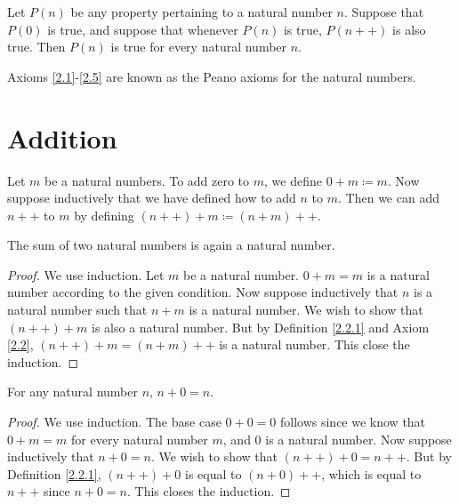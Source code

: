 \begin{axiom}\label{2.5}
Let \(P(n)\) be any property pertaining to a natural number \(n\).
Suppose that \(P(0)\) is true, and suppose that whenever \(P(n)\) is true, \(P(n++)\) is also true.
Then \(P(n)\) is true for every natural number \(n\).
\end{axiom}

\begin{note}
Axioms \ref{2.1}-\ref{2.5} are known as the Peano axioms for the natural numbers.
\end{note}

\section{Addition}

\begin{definition}\label{2.2.1}
Let \(m\) be a natural numbers.
To add zero to \(m\), we define \(0+m \coloneqq m\).
Now suppose inductively that we have defined how to add \(n\) to \(m\).
Then we can add \(n++\) to \(m\) by defining \((n++) + m \coloneqq (n + m)++\).
\end{definition}

\begin{additional corollary}\label{ac 2.2.1}
The sum of two natural numbers is again a natural number.
\end{additional corollary}

\begin{proof}
We use induction.
Let \(m\) be a natural number.
\(0 + m = m\) is a natural number according to the given condition.
Now suppose inductively that \(n\) is a natural number such that \(n + m\) is a natural number.
We wish to show that \((n++) + m\) is also a natural number.
But by Definition \ref{2.2.1} and Axiom \ref{2.2},
\((n++) + m = (n + m)++\) is a natural number.
This close the induction.
\end{proof}

\begin{lemma}\label{2.2.2}
For any natural number \(n\), \(n + 0 = n\).
\end{lemma}

\begin{proof}
We use induction.
The base case \(0 + 0 = 0\) follows since we know that \(0 + m = m\) for every natural number \(m\), and \(0\) is a natural number.
Now suppose inductively that \(n + 0 = n\).
We wish to show that \((n++) + 0 = n++\).
But by Definition \ref{2.2.1}, \((n++) + 0\) is equal to \((n + 0)++\), which is equal to \(n++\) since \(n + 0 = n\).
This closes the induction.
\end{proof}

